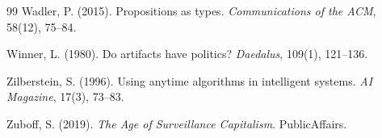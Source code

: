 \documentclass[11pt,a4paper]{article}
\begin{document}
\begin{thebibliography}{99}
Wadler, P. (2015).
\newblock Propositions as types.
\newblock \emph{Communications of the ACM}, 58(12), 75--84.

Winner, L. (1980).
\newblock Do artifacts have politics?
\newblock \emph{Daedalus}, 109(1), 121--136.

Zilberstein, S. (1996).
\newblock Using anytime algorithms in intelligent systems.
\newblock \emph{AI Magazine}, 17(3), 73--83.

Zuboff, S. (2019).
\newblock \emph{The Age of Surveillance Capitalism}.
\newblock PublicAffairs.

\end{thebibliography}
\end{document}
